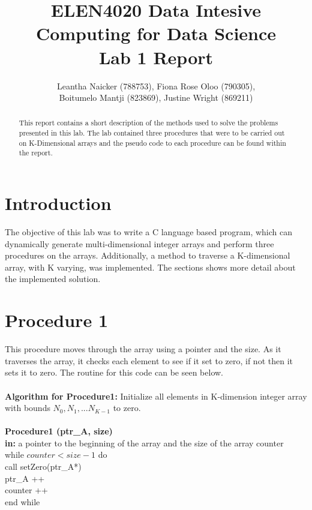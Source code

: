 \documentclass[10pt,a4paper]{article}
\title{\textbf{ELEN4020 Data Intesive Computing for Data Science\\Lab 1 Report}}
\author{Leantha Naicker (788753), Fiona Rose Oloo (790305),\\Boitumelo Mantji (823869), Justine Wright (869211)}
\affil{The University of Witwatersrand}
\begin{document}
\maketitle
\begin{abstract}
This report contains a short description of the methods used to solve the problems presented in this lab. The lab contained three procedures that were to be carried out on K-Dimensional arrays and the pseudo code to each procedure can be found within the report.
\end{abstract}

\section{Introduction}
The objective of this lab was to write a C language based program, which can dynamically generate multi-dimensional integer arrays and perform three procedures on the arrays. Additionally, a method to traverse a K-dimensional array, with K varying, was implemented. The sections shows more detail about the implemented solution. 

\section{Procedure 1}
This procedure moves through the array using a pointer and the size. As it traverses the array, it checks each element to see if it set to zero, if not then it sets it to zero. The routine for this code can be seen below.\\ \\
\textbf{Algorithm for Procedure1:} Initialize all elements in K-dimension integer array with bounds $N_{0}, N_{1}, ... N_{K-1}$ to zero. \\ \\
\textbf{Procedure1 (ptr\_A, size)} \\
\indent \textbf{in:} a pointer to the beginning of the array and the size of the array counter\\
\indent while $counter < size-1$ do \\
\indent\indent call setZero(ptr\_A*) \\
\indent\indent ptr\_A ++ \\
\indent\indent counter ++ \\
\indent end while
\end{document}
